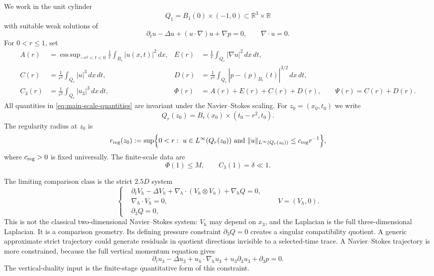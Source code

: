 \documentclass[11pt]{article}
\numberwithin{equation}{section}
\theoremstyle{plain}
\theoremstyle{definition}
\theoremstyle{remark}
\DeclareMathOperator*{\esssup}{ess\,sup}
\newcommand{\R}{\mathbb R}
\newcommand{\reg}{\mathrm{reg}}
\begin{document}
We work in the unit cylinder
\[
        Q_1=B_1(0)\times(-1,0)\subset\R^3\times\R
\]
with suitable weak solutions of
\begin{equation}\label{eq:main-NS}
        \partial_tu-\Delta u+(u\cdot\nabla)u+\nabla p=0,
        \qquad \nabla\cdot u=0.
\end{equation}
For \(0<r\le1\), set
\begin{align}
A(r)&=\esssup_{-r^2<t<0}\frac1r\int_{B_r}|u(x,t)|^2\,dx,
&
E(r)&=\frac1r\int_{Q_r}|\nabla u|^2\,dx\,dt,\nonumber\\
C(r)&=\frac1{r^2}\int_{Q_r}|u|^3\,dx\,dt,
&
D(r)&=\frac1{r^2}\int_{Q_r}|p-(p)_{B_r}(t)|^{3/2}\,dx\,dt,\label{eq:main-scale-quantities}\\
C_3(r)&=\frac1{r^2}\int_{Q_r}|u_3|^3\,dx\,dt,
&
\Phi(r)&=A(r)+E(r)+C(r)+D(r),\qquad \Psi(r)=C(r)+D(r).\nonumber
\end{align}
All quantities in \eqref{eq:main-scale-quantities} are invariant under the Navier--Stokes scaling.  For \(z_0=(x_0,t_0)\) we write
\[
        Q_r(z_0)=B_r(x_0)\times(t_0-r^2,t_0).
\]
The regularity radius at \(z_0\) is
\begin{equation}\label{eq:main-regularity-radius-definition}
        r_{\reg}(z_0)
        :=\sup\Bigl\{0<r:\ u\in L^\infty(Q_r(z_0))
        \text{ and } \|u\|_{L^\infty(Q_r(z_0))}\le c_{\rm reg}r^{-1}\Bigr\},
\end{equation}
where \(c_{\rm reg}>0\) is fixed universally.  The finite-scale data are
\begin{equation}\label{eq:main-data}
        \Phi(1)\le M,
        \qquad C_3(1)=\delta\ll1.
\end{equation}

The limiting comparison class is the strict \(2.5D\) system
\begin{equation}\label{eq:main-strict-system}
\left\{
\begin{aligned}
        &\partial_tV_h-\Delta V_h+\nabla_h\cdot(V_h\otimes V_h)+\nabla_hQ=0,\\
        &\nabla_h\cdot V_h=0,\\
        &\partial_3Q=0,
\end{aligned}
\right.
\qquad V=(V_h,0).
\end{equation}
This is not the classical two-dimensional Navier--Stokes system: \(V_h\) may depend on \(x_3\), and the Laplacian is the full three-dimensional Laplacian.  It is a comparison geometry.  Its defining pressure constraint \(\partial_3Q=0\) creates a singular compatibility quotient.  A generic approximate strict trajectory could generate residuals in quotient directions invisible to a selected-time trace.  A Navier--Stokes trajectory is more constrained, because the full vertical momentum equation gives
\begin{equation}\label{eq:main-vertical-momentum}
        \partial_tu_3-\Delta u_3+u_h\cdot\nabla_hu_3+u_3\partial_3u_3+\partial_3p=0.
\end{equation}
The vertical-duality input is the finite-stage quantitative form of this constraint.
\end{document}
